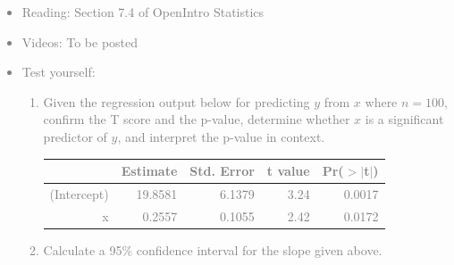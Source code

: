 \documentclass[11pt]{article}
\newcommand{\gray}[1]{\textcolor{gray}{#1}}
\begin{document}
\gray{
{\it
\vspace{-0.55cm}
\begin{itemize}
\renewcommand{\labelitemi}{{\textcolor{dark}{$\ast$}}}
\item Reading: Section 7.4 of OpenIntro Statistics
\item Videos: To be posted 
\item Test yourself: 
\begin{enumerate}
\item Given the regression output below for predicting $y$ from $x$ where $n = 100$, confirm the T score and the p-value, determine whether $x$ is a significant predictor of $y$, and interpret the p-value in context.
\begin{center}
\begin{tabular}{rrrrr}
  \hline
 & Estimate & Std. Error & t value & Pr($>$$|$t$|$) \\ 
  \hline
(Intercept) & 19.8581 & 6.1379 & 3.24 & 0.0017 \\ 
  x & 0.2557 & 0.1055 & 2.42 & 0.0172 \\ 
   \hline
\end{tabular}
\end{center}
\item Calculate a 95\% confidence interval for the slope given above.
\end{enumerate}
\end{itemize}
}}
\end{document}

